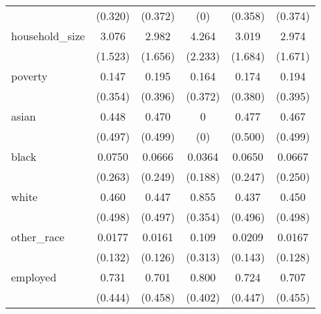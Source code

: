 \begin{table}[htbp]
\begin{tabular}{l*{5}{c}}
                    &     (0.320)         &     (0.372)         &         (0)         &     (0.358)         &     (0.374)         \\
[1em]
household\_size      &       3.076         &       2.982         &       4.264         &       3.019         &       2.974         \\
                    &     (1.523)         &     (1.656)         &     (2.233)         &     (1.684)         &     (1.671)         \\
[1em]
poverty             &       0.147         &       0.195         &       0.164         &       0.174         &       0.194         \\
                    &     (0.354)         &     (0.396)         &     (0.372)         &     (0.380)         &     (0.395)         \\
[1em]
asian               &       0.448         &       0.470         &           0         &       0.477         &       0.467         \\
                    &     (0.497)         &     (0.499)         &         (0)         &     (0.500)         &     (0.499)         \\
[1em]
black               &      0.0750         &      0.0666         &      0.0364         &      0.0650         &      0.0667         \\
                    &     (0.263)         &     (0.249)         &     (0.188)         &     (0.247)         &     (0.250)         \\
[1em]
white               &       0.460         &       0.447         &       0.855         &       0.437         &       0.450         \\
                    &     (0.498)         &     (0.497)         &     (0.354)         &     (0.496)         &     (0.498)         \\
[1em]
other\_race          &      0.0177         &      0.0161         &       0.109         &      0.0209         &      0.0167         \\
                    &     (0.132)         &     (0.126)         &     (0.313)         &     (0.143)         &     (0.128)         \\
[1em]
employed            &       0.731         &       0.701         &       0.800         &       0.724         &       0.707         \\
                    &     (0.444)         &     (0.458)         &     (0.402)         &     (0.447)         &     (0.455)         \\

\end{tabular}
\end{table}
